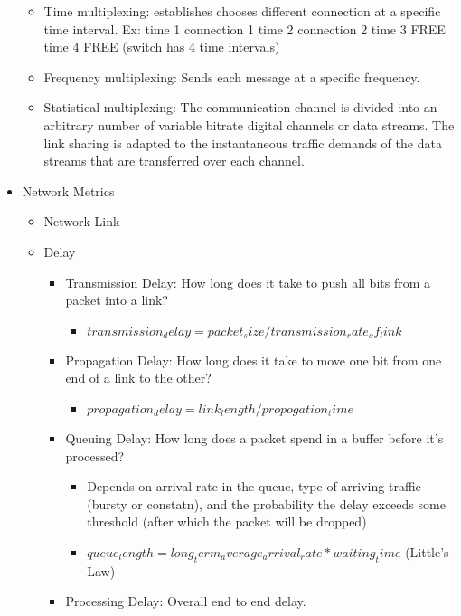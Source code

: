\begin{itemize}
  \begin{itemize}
  \tightlist
  \item
    Time multiplexing: establishes chooses different connection at a
    specific time interval. Ex: time 1 connection 1 time 2 connection 2
    time 3 FREE time 4 FREE (switch has 4 time intervals)
  \item
    Frequency multiplexing: Sends each message at a specific
    frequency.\\
  \item
    Statistical multiplexing: The communication channel is divided into
    an arbitrary number of variable bitrate digital channels or data
    streams. The link sharing is adapted to the instantaneous traffic
    demands of the data streams that are transferred over each channel.
  \end{itemize}
\item
  Network Metrics

  \begin{itemize}
  \tightlist
  \item
    Network Link
  \item
    Delay

    \begin{itemize}
    \tightlist
    \item
      Transmission Delay: How long does it take to push all bits from a
      packet into a link?

      \begin{itemize}
      \tightlist
      \item
        \(transmission_delay = packet_size / transmission_rate_of_link\)
      \end{itemize}
    \item
      Propagation Delay: How long does it take to move one bit from one
      end of a link to the other?

      \begin{itemize}
      \tightlist
      \item
        \(propagation_delay = link_length / propogation_time\)
      \end{itemize}
    \item
      Queuing Delay: How long does a packet spend in a buffer before
      it's processed?

      \begin{itemize}
      \tightlist
      \item
        Depends on arrival rate in the queue, type of arriving traffic
        (bursty or constatn), and the probability the delay exceeds some
        threshold (after which the packet will be dropped)
      \item
        \(queue_length = long_term_average_arrival_rate * waiting_time\)
        (Little's Law)
      \end{itemize}
    \item
      Processing Delay: Overall end to end delay.
    \end{itemize}
  \end{itemize}
\end{itemize}

